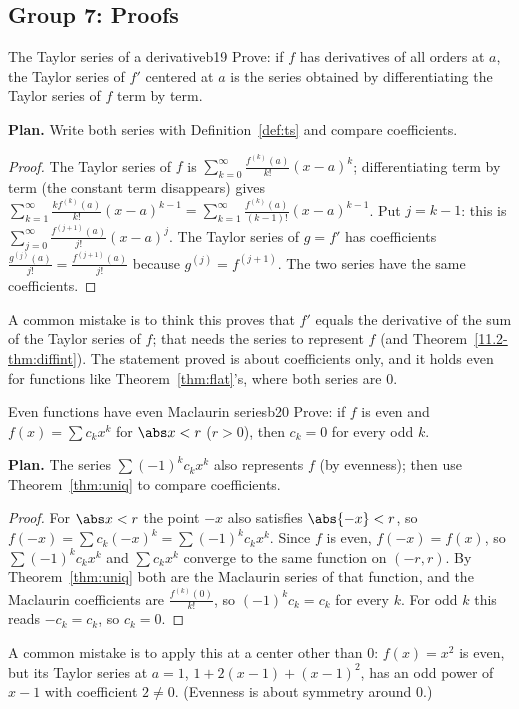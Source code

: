 \documentclass[11pt]{article}
\begin{document}
\subsection*{Group 7: Proofs}

\begin{exmp}{The Taylor series of a derivative}{b19}
Prove: if $f$ has derivatives of all orders at $a$, the Taylor series of $f'$ centered at $a$ is the series obtained by differentiating the Taylor series of $f$ term by term.

\textbf{Plan.} Write both series with Definition~\ref{def:ts} and compare coefficients.

\begin{proof}
The Taylor series of $f$ is $\sum_{k=0}^\infty\frac{f^{(k)}(a)}{k!}(x-a)^k$; differentiating term by term (the constant term disappears) gives $\sum_{k=1}^\infty\frac{kf^{(k)}(a)}{k!}(x-a)^{k-1}=\sum_{k=1}^\infty\frac{f^{(k)}(a)}{(k-1)!}(x-a)^{k-1}$. Put $j=k-1$: this is $\sum_{j=0}^\infty\frac{f^{(j+1)}(a)}{j!}(x-a)^j$. The Taylor series of $g=f'$ has coefficients $\frac{g^{(j)}(a)}{j!}=\frac{f^{(j+1)}(a)}{j!}$ because $g^{(j)}=f^{(j+1)}$. The two series have the same coefficients.
\end{proof}
A common mistake is to think this proves that $f'$ equals the derivative of the sum of the Taylor series of $f$; that needs the series to represent $f$ (and Theorem~\ref{11.2-thm:diffint}). The statement proved is about coefficients only, and it holds even for functions like Theorem~\ref{thm:flat}'s, where both series are $0$.
\end{exmp}

\begin{exmp}{Even functions have even Maclaurin series}{b20}
Prove: if $f$ is even and $f(x)=\sum c_kx^k$ for $\abs x<r$ ($r>0$), then $c_k=0$ for every odd $k$.

\textbf{Plan.} The series $\sum(-1)^kc_kx^k$ also represents $f$ (by evenness); then use Theorem~\ref{thm:uniq} to compare coefficients.

\begin{proof}
For $\abs x<r$ the point $-x$ also satisfies $\abs{-x}<r$, so $f(-x)=\sum c_k(-x)^k=\sum(-1)^kc_kx^k$. Since $f$ is even, $f(-x)=f(x)$, so $\sum(-1)^kc_kx^k$ and $\sum c_kx^k$ converge to the same function on $(-r,r)$. By Theorem~\ref{thm:uniq} both are the Maclaurin series of that function, and the Maclaurin coefficients are $\frac{f^{(k)}(0)}{k!}$, so $(-1)^kc_k=c_k$ for every $k$. For odd $k$ this reads $-c_k=c_k$, so $c_k=0$.
\end{proof}
A common mistake is to apply this at a center other than $0$: $f(x)=x^2$ is even, but its Taylor series at $a=1$, $1+2(x-1)+(x-1)^2$, has an odd power of $x-1$ with coefficient $2\ne0$. (Evenness is about symmetry around $0$.)
\end{exmp}
\end{document}
